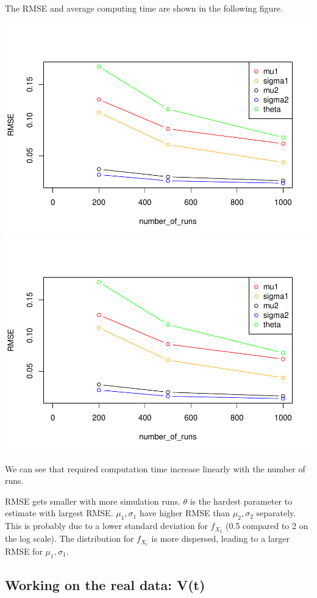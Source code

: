 \documentclass[11pt,]{article}
\begin{document}
The RMSE and average computing time are shown in the following figure.

\includegraphics{figs/unnamed-chunk-13.pdf}
\includegraphics{figs/unnamed-chunk-13.pdf}

We can see that required computation time increase linearly with the
number of runs.

RMSE gets smaller with more simulation runs. \(\theta\) is the hardest
parameter to estimate with largest RMSE. \(\mu_1, \sigma_1\) have higher
RMSE than \(\mu_2, \sigma_2\) separately. This is probably due to a
lower standard deviation for \(f_{X_2}\) (0.5 compared to 2 on the log
scale). The distribution for \(f_{X_1}\) is more dispersed, leading to a
larger RMSE for \(\mu_1, \sigma_1\).

\hypertarget{working-on-the-real-data-vt}{%
\subsection{Working on the real data:
V(t)}\label{working-on-the-real-data-vt}}
\end{document}
